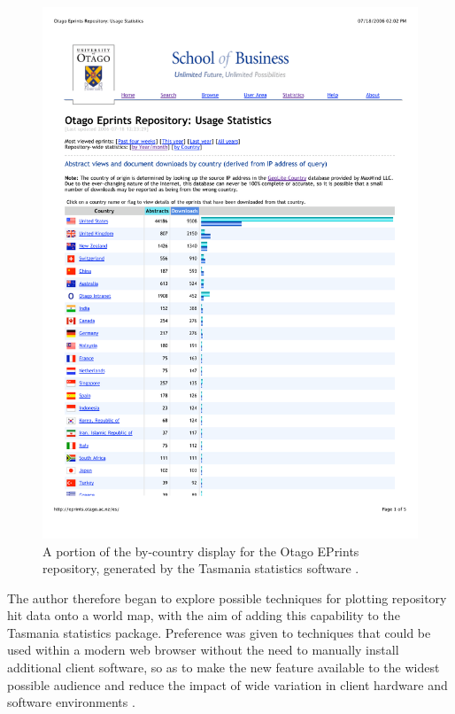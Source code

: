 \documentclass[acmnow]{acmtrans2m}
\begin{document}
\begin{figure}
	\centering
	\includegraphics[width=\textwidth,keepaspectratio]{tasmania_stats}
	\caption{A portion of the by-country display for the Otago EPrints
	repository, generated by the Tasmania statistics software
	\protect\cite{Sale-A-2006-stats}.}
	\label{fig-tas-stats}
\end{figure}


The author therefore began to explore possible techniques for plotting
repository hit data onto a world map, with the aim of adding this
capability to the Tasmania statistics package. Preference was given to
techniques that could be used within a modern web browser without the
need to manually install additional client software, so as to make the
new feature available to the widest possible audience and reduce the
impact of wide variation in client hardware and software environments
\cite[pp.\ 27--28]{Offu-J-2002-quality}.
\end{document}
